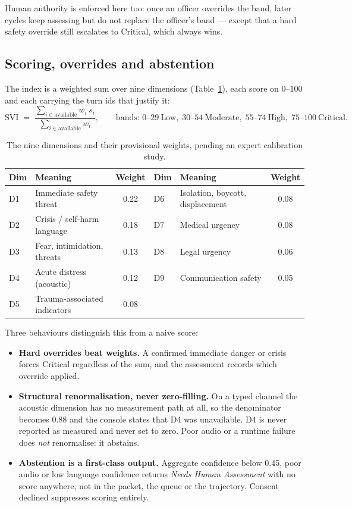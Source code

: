 \documentclass[11pt,a4paper]{article}
\begin{document}
Human authority is enforced here too: once an officer overrides the band, later cycles keep assessing
but do not replace the officer's band --- except that a hard safety override still escalates to
Critical, which always wins.

\subsection{Scoring, overrides and abstention}
\label{sec:svi}
The index is a weighted sum over nine dimensions (Table~\ref{tab:svi}), each score on 0--100 and each
carrying the turn ids that justify it:
\[
\mathrm{SVI} \;=\; \frac{\sum_{i \in \text{available}} w_i\, s_i}{\sum_{i \in \text{available}} w_i},
\qquad
\text{bands: } 0\text{--}29\ \text{Low},\; 30\text{--}54\ \text{Moderate},\; 55\text{--}74\ \text{High},\; 75\text{--}100\ \text{Critical}.
\]

\begin{table}[!htbp]
\centering\small
\caption{The nine dimensions and their provisional weights, pending an expert calibration study.}
\label{tab:svi}
\begin{tabular}{@{}llc@{\hspace{0.6cm}}llc@{}}
\toprule
Dim & Meaning & Weight & Dim & Meaning & Weight \\
\midrule
D1 & Immediate safety threat & 0.22 & D6 & Isolation, boycott, displacement & 0.08 \\
D2 & Crisis / self-harm language & 0.18 & D7 & Medical urgency & 0.08 \\
D3 & Fear, intimidation, threats & 0.13 & D8 & Legal urgency & 0.06 \\
D4 & Acute distress (acoustic) & 0.12 & D9 & Communication safety & 0.05 \\
D5 & Trauma-associated indicators & 0.08 & & & \\
\bottomrule
\end{tabular}
\end{table}

Three behaviours distinguish this from a naive score:
\begin{itemize}
  \item \textbf{Hard overrides beat weights.} A confirmed immediate danger or crisis forces Critical
        regardless of the sum, and the assessment records which override applied.
  \item \textbf{Structural renormalisation, never zero-filling.} On a typed channel the acoustic
        dimension has no measurement path at all, so the denominator becomes 0.88 and the console
        states that D4 was unavailable. D4 is never reported as measured and never set to zero. Poor
        audio or a runtime failure does \emph{not} renormalise: it abstains.
  \item \textbf{Abstention is a first-class output.} Aggregate confidence below 0.45, poor audio or
        low language confidence returns \emph{Needs Human Assessment} with no score anywhere, not in
        the packet, the queue or the trajectory. Consent declined suppresses scoring entirely.
\end{itemize}
\end{document}
